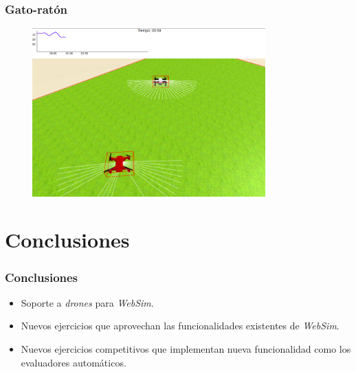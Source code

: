 \documentclass[xcolor={table}]{beamer}
\begin{document}
		\begin{frame}
			\frametitle{Gato-ratón}
       \begin{figure}
         \href{https://youtu.be/xA9Emhdk_HQ}
              {\includegraphics[width=0.8\textwidth]{img/evaluador_drone.png}}
       \end{figure}
		\end{frame}

	\section{Conclusiones}
		\begin{frame}
			\frametitle{Conclusiones}
			\begin{itemize}
				\item Soporte a \textit{drones} para \textit{WebSim}. 
				\item Nuevos ejercicios que aprovechan las funcionalidades existentes de \textit{WebSim}.
				\item Nuevos ejercicios competitivos que implementan nueva funcionalidad como los evaluadores automáticos. 
			\end{itemize}
		\end{frame}
	
	\appendix

	\backupbegin
	
	\backupend
\end{document}
